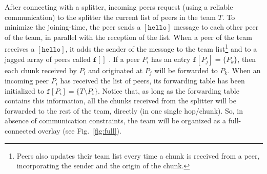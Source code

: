 

\label{sec:joining}

After connecting with a splitter, incoming peers request (using a
reliable communication) to the splitter the current list of peers in
the team $T$. To minimize the \gls{joining-time}, the peer sends a
$[\mathtt{hello}]$ message to each other peer of the team, in parallel
with the reception of the list. When a peer of the team receives a
$[\mathtt{hello}]$, it adds the sender of the message to the team
list\footnote{Peers also updates their team list every time a chunk is
  received from a peer, incorporating the sender and the origin of the
  chunk.} and to a jagged array of peers called $\mathtt{f}[]$
. If a peer $P_i$ has an entry
$\mathtt{f}[P_j]=\{P_k\}$, then each chunk received by $P_i$ and
originated at $P_j$ will be forwarded to $P_k$. When an incoming peer
$P_i$ has received the list of peers, its forwarding table has been
initialized to $\mathtt{f}[P_i]=\{T\setminus P_i\}$. Notice
that, as long as the forwarding table contains this information, all
the chunks received from the splitter will be forwarded to the rest of
the team, directly (in one single hop/chunk). So, in absence of
communication constraints, the team will be organized as a
full-connected overlay (see Fig.~\ref{fig:full}).



